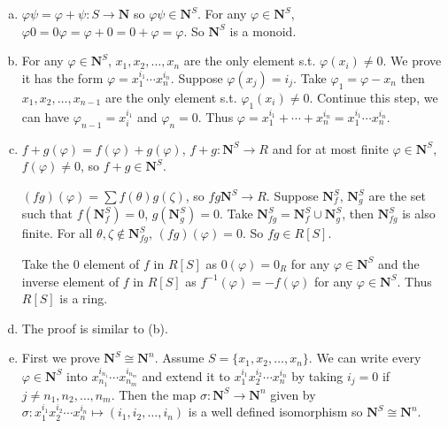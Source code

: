 \begin{answer}
    \begin{enumerate}[(a)]
        \item $\varphi\psi=\varphi+\psi:S\to \mathbf{N}$ so $\varphi\psi\in\mathbf{N}^{S}$. For any $\varphi\in\mathbf{N}^{S}$, $\varphi 0=0\varphi=\varphi+0=0+\varphi=\varphi$. So $\mathbf{N}^{S}$ is a monoid.
        \item For any $\varphi\in\mathbf{N}^{S}$, $x_{1},x_{2},\dots,x_{n}$ are the only element s.t. $\varphi(x_{i})\neq 0$. We prove it has the form $\varphi=x_{1}^{i_{1}}\cdots x_{n}^{i_{n}}$. Suppose $\varphi(x_{j})=i_{j}$. Take $\varphi_{1}=\varphi-x_{n}$ then $x_{1},x_{2},\dots,x_{n-1}$ are the only element s.t. $\varphi_{1}(x_{i})\neq 0$. Continue this step, we can have $\varphi_{n-1}=x_{i}^{i_{1}}$ and $\varphi_{n}=0$. Thus $\varphi=x_{1}^{i_{1}}+\cdots +x_{n}^{i_{n}}=x_{1}^{i_{1}}\cdots x_{n}^{i_{n}}$.
        \item $f+g(\varphi)=f(\varphi)+g(\varphi)$, $f+g:\mathbf{N}^{S}\to R$ and for at most finite $\varphi\in\mathbf{N}^{S}$, $f(\varphi)\neq 0$, so $f+g\in\mathbf{N}^{S}$.
        
        $(fg)(\varphi)=\sum f(\theta)g(\zeta)$, so $fg\mathbf{N}^{S}\to R$. Suppose $\mathbf{N}_{f}^{S}$, $\mathbf{N}_{g}^{S}$ are the set such that $f(\mathbf{N}_{f}^{S})=0$, $g(\mathbf{N}_{g}^{S})=0$. Take $\mathbf{N}_{fg}^{S}=\mathbf{N}_{f}^{S}\cup \mathbf{N}_{g}^{S}$, then $\mathbf{N}_{fg}^{S}$ is also finite. For all $\theta, \zeta\notin \mathbf{N}_{fg}^{S}$, $(fg)(\varphi)=0$. So $fg\in R[S]$.

        Take the 0 element of $f$ in $R[S]$ as $0(\varphi)=0_{R}$ for any $\varphi\in \mathbf{N}^{S}$ and the inverse element of $f$ in $R[S]$ as $f^{-1}(\varphi)=-f(\varphi)$ for any $\varphi\in \mathbf{N}^{S}$. Thus $R[S]$ is a ring.
        \item The proof is similar to (b).
        \item First we prove $\mathbf{N}^{S}\cong \mathbf{N}^{n}$. Assume $S=\{x_{1},x_{2},\dots,x_{n}\}$. We can write every $\varphi\in\mathbf{N}^{S}$ into $x_{n_{1}}^{i_{n_{1}}}\cdots x_{n_{m}}^{i_{n_{m}}}$ and extend it to $x_{1}^{i_{1}}x_{2}^{i_{2}}\cdots x_{n}^{i_{n}}$ by taking $i_{j}=0$ if $j\neq n_{1},n_{2},\dots,n_{m}$. Then the map $\sigma:\mathbf{N}^{S}\to \mathbf{N}^{n}$ given by $\sigma:x_{1}^{i_{1}}x_{2}^{i_{2}}\cdots x_{n}^{i_{n}}\mapsto (i_{1},i_{2},\dots, i_{n})$ is a well defined isomorphism so $\mathbf{N}^{S}\cong \mathbf{N}^{n}$.
        

\end{enumerate}
\end{answer}
